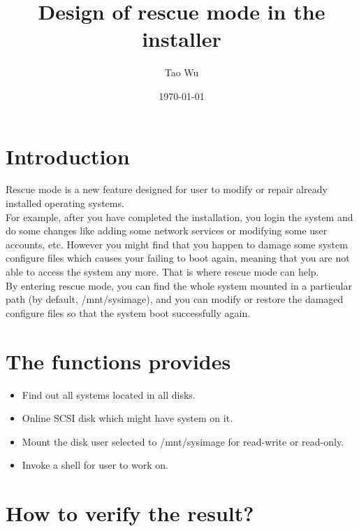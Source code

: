 \documentclass{article}
\begin{document}
\title{\textbf{Design of rescue mode in the installer}}
\author{Tao Wu}
\date{\today}
\maketitle
\section{Introduction}
Rescue mode is a new feature designed for user to modify or repair already
installed operating systems. \\

For example, after you have completed the installation, you login the system and
do some changes like adding some network services or modifying some user
accounts, etc. However you might find that you happen to damage some system
configure files which causes your failing to boot again, meaning that you are
not able to access the system any more. That is where rescue mode can help.\\

By entering rescue mode, you can find the whole system mounted in a particular
path (by default, /mnt/sysimage), and you can modify or restore the damaged
configure files so that the system boot successfully again.\\

\section{The functions provides}
\begin{itemize}
\item Find out all systems located in all disks.
\item Online SCSI disk which might have system on it.
\item Mount the disk user selected to /mnt/sysimage for read-write or read-only.
\item Invoke a shell for user to work on.
\end{itemize}

\section{How to verify the result?}
\end{document}
